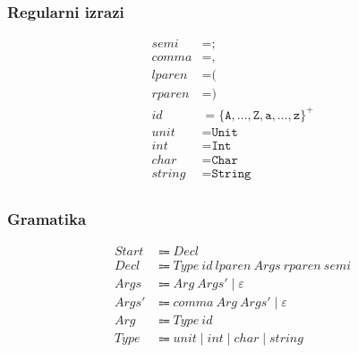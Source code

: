 \documentclass{report}
\newcommand{\Null}{\varepsilon}
\newcommand{\Char}[1]{\texttt{#1}}
\newcommand{\Spc}{\ }
\newcommand{\Union}{\mathrel{|}}
\newcommand{\KleenePlus}[1]{#1^+}
\newcommand{\Arrow}{\Coloneq}
\newcommand{\NT}[1]{{#1}}
\newcommand{\T}[1]{{#1}}
\begin{document}
    \subsubsection*{Regularni izrazi}
    \begin{equation*}
      \begin{aligned}
        \T{semi} &= \Char{;}\\
        \T{comma} &= \Char{,}\\
        \T{lparen} &= \Char{(}\\
        \T{rparen} &= \Char{)}\\
        \T{id} &= \KleenePlus{\{\Char{A}, \dots, \Char{Z}, \Char{a}, \dots, \Char{z}\}}\\
        \T{unit} &= \Char{Unit}\\
        \T{int} &= \Char{Int}\\
        \T{char} &= \Char{Char}\\
        \T{string} &= \Char{String}\\
      \end{aligned}
    \end{equation*}

    \subsubsection*{Gramatika}
    \begin{equation*}
      \begin{aligned}
        \NT{Start} &\Arrow \NT{Decl}\\
        \NT{Decl} &\Arrow \NT{Type} \Spc \T{id} \Spc \T{lparen} \Spc \NT{Args} \Spc \T{rparen} \Spc \T{semi}\\
        \NT{Args} &\Arrow \NT{Arg} \Spc \NT{Args'} \Union \Null\\
        \NT{Args'} &\Arrow \T{comma} \Spc \NT{Arg} \Spc \NT{Args'} \Union \Null\\
        \NT{Arg} &\Arrow \NT{Type} \Spc \T{id}\\
        \NT{Type} &\Arrow \T{unit} \Union \T{int} \Union \T{char} \Union \T{string}\\
      \end{aligned}
    \end{equation*}
\end{document}
